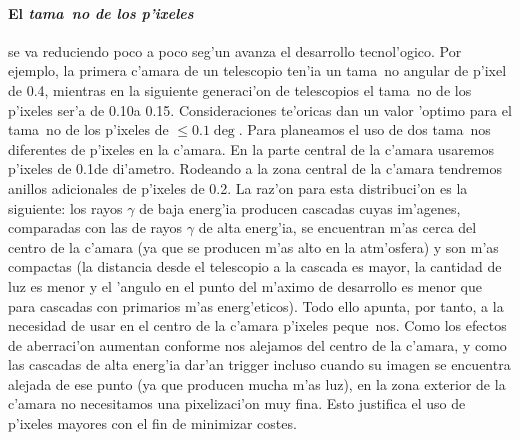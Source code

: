 \paragraph{El \emph{tama~no de los p'ixeles}} se va reduciendo poco a
poco seg'un avanza el desarrollo tecnol'ogico. Por ejemplo, la primera
c'amara de un telescopio \HEGRA ten'ia un tama~no angular de p'ixel de
0.4\deg, mientras en la siguiente generaci'on de telescopios
\Cherenkov el tama~no de los p'ixeles ser'a de 0.10\deg a 0.15\deg.
Consideraciones te'oricas dan un valor 'optimo para el tama~no de los
p'ixeles de $\leq 0.1\deg$. Para \MAGIC planeamos el uso de dos
tama~nos diferentes de p'ixeles en la c'amara. En la parte central de
la c'amara usaremos p'ixeles de 0.1\deg de di'ametro. Rodeando a la
zona central de la c'amara tendremos anillos adicionales de p'ixeles
de 0.2\deg. La raz'on para esta distribuci'on es la siguiente: los
rayos $\gamma$ de baja energ'ia producen cascadas cuyas im'agenes,
comparadas con las de rayos $\gamma$ de alta energ'ia, se encuentran
m'as cerca del centro de la c'amara (ya que se producen m'as alto en
la atm'osfera) y son m'as compactas (la distancia desde el telescopio
a la cascada es mayor, la cantidad de luz es menor y el 'angulo
\Cherenkov en el punto del m'aximo de desarrollo es menor que para
cascadas con primarios m'as energ'eticos). Todo ello apunta, por
tanto, a la necesidad de usar en el centro de la c'amara p'ixeles
peque~nos. Como los efectos de aberraci'on aumentan conforme nos
alejamos del centro de la c'amara, y como las cascadas de alta
energ'ia dar'an trigger incluso cuando su imagen se encuentra alejada
de ese punto (ya que producen mucha m'as luz), en la zona exterior de
la c'amara no necesitamos una pixelizaci'on muy fina. Esto justifica
el uso de p'ixeles mayores con el fin de minimizar costes.

\mirrorsandwichfig

